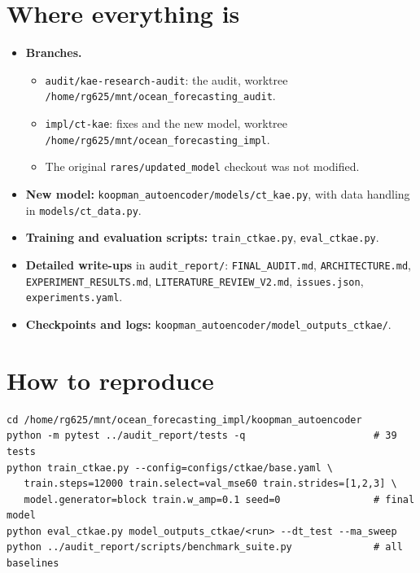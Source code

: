 \documentclass[10.5pt,a4paper]{article}
\begin{document}
\appendix
\section{Where everything is}
\begin{itemize}
\item \textbf{Branches.}
  \begin{itemize}
  \item \texttt{audit/kae-research-audit}: the audit, worktree
    \texttt{/home/rg625/mnt/ocean\_forecasting\_audit}.
  \item \texttt{impl/ct-kae}: fixes and the new model, worktree
    \texttt{/home/rg625/mnt/ocean\_forecasting\_impl}.
  \item The original \texttt{rares/updated\_model} checkout was not modified.
  \end{itemize}
\item \textbf{New model:} \texttt{koopman\_autoencoder/models/ct\_kae.py}, with data handling in
  \texttt{models/ct\_data.py}.
\item \textbf{Training and evaluation scripts:} \texttt{train\_ctkae.py},
  \texttt{eval\_ctkae.py}.
\item \textbf{Detailed write-ups} in \texttt{audit\_report/}: \texttt{FINAL\_AUDIT.md},
  \texttt{ARCHITECTURE.md}, \texttt{EXPERIMENT\_RESULTS.md},
  \texttt{LITERATURE\_REVIEW\_V2.md}, \texttt{issues.json}, \texttt{experiments.yaml}.
\item \textbf{Checkpoints and logs:} \texttt{koopman\_autoencoder/model\_outputs\_ctkae/}.
\end{itemize}

\section{How to reproduce}
\begin{verbatim}
cd /home/rg625/mnt/ocean_forecasting_impl/koopman_autoencoder
python -m pytest ../audit_report/tests -q                      # 39 tests
python train_ctkae.py --config=configs/ctkae/base.yaml \
   train.steps=12000 train.select=val_mse60 train.strides=[1,2,3] \
   model.generator=block train.w_amp=0.1 seed=0                # final model
python eval_ctkae.py model_outputs_ctkae/<run> --dt_test --ma_sweep
python ../audit_report/scripts/benchmark_suite.py              # all baselines
\end{verbatim}
\end{document}
